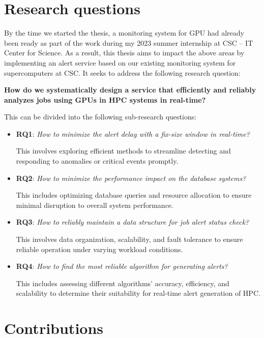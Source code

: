 \section{Research questions}
\label{sec:rqs}
By the time we started the thesis, a monitoring system for GPU had already been ready as part of the work during my 2023 summer internship at CSC -- IT Center for Science. As a result, this thesis aims to impact the above areas by implementing an alert service based on our existing monitoring system for supercomputers at CSC. It seeks to address the following research question:

\textbf{
How do we systematically design a service that efficiently and reliably analyzes jobs using GPUs in HPC systems in real-time?
}

This can be divided into the following sub-research questions:

\begin{itemize}
    \item \textbf{RQ1}: \textit{How to minimize the alert delay with a fix-size window in real-time?}

This involves exploring efficient methods to streamline detecting and responding to anomalies or critical events promptly.

    \item \textbf{RQ2}: \textit{How to minimize the performance impact on the database systems?}

This includes optimizing database queries and resource allocation to ensure minimal disruption to overall system performance.

    \item \textbf{RQ3}: \textit{How to reliably maintain a data structure for job alert status check?}

This involves data organization, scalability, and fault tolerance to ensure reliable operation under varying workload conditions.
    
    \item \textbf{RQ4}: \textit{How to find the most reliable algorithm for generating alerts?}

This includes assessing different algorithms' accuracy, efficiency, and scalability to determine their suitability for real-time alert generation of HPC.

\end{itemize}


\section{Contributions}

